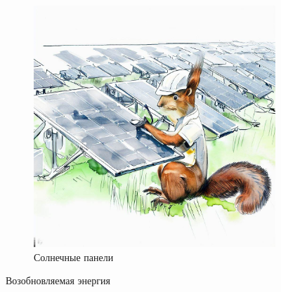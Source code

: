 \documentclass[a5paper,11pt]{memoir}
\begin{document}
\begin{figure}
\begin{subfigure}{.33\paperwidth}
    \centering
    \includegraphics[width=.8\linewidth]{images/squirrel-solar-panel.jpg}
    \caption{Солнечные панели}
  \end{subfigure}
  \caption{Возобновляемая энергия}
\end{figure}

\vspace{-5.5cm}
\end{document}
